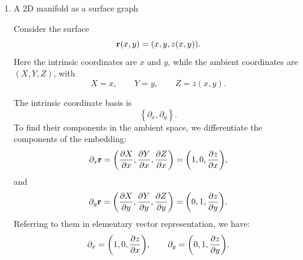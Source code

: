 \begin{enumerate}[(1)]
				Referring to them in the same way as elementary vector physics\footnote{I must reiterate this enough. This is a heuristic, a tool, that relates the abstract vector to how it is usually presented in introductory physics to make it more intuitive. Do not confuse the elementary vector representation to what the actual vector (geometric object) is. They are not the same thing.}
				Thus, the two coordinate basis vectors have the ambient
				representations
				\begin{align*}
					\partial_\theta
					&=
					\pqty{
						\cos\theta\cos\phi,
						\cos\theta\sin\phi,
						-\sin\theta
					}\\
					\partial_\phi
					&=
					\pqty{
						-\sin\theta\sin\phi,
						\sin\theta\cos\phi,
						0
					}
				\end{align*}
				An arbitrary tangent vector is
				\[
					V
					=
					V^\theta\partial_\theta
					+
					V^\phi\partial_\phi.
				\]
				Therefore, its ambient components are
				\[
					V
					=
					\bmqty{
						V^\theta\cos\theta\cos\phi
						-
						V^\phi\sin\theta\sin\phi\\
						V^\theta\cos\theta\sin\phi
						+
						V^\phi\sin\theta\cos\phi\\
						-V^\theta\sin\theta
					}
				\]

				Thus, although the vector is represented by three components
				in the ambient space, it has only two independent components,
				$V^\theta$ and $V^\phi$, because it is tangent to a $2$D manifold.
			\item A $2$D manifold as a surface graph

				Consider the surface
				\[
					\vb{r}(x,y)
					=
					\qty(
						x,y,z(x,y)
					).
				\]
				Here the intrinsic coordinates are $x$ and $y$, while the
				ambient coordinates are $(X,Y,Z)$, with
				\[
					X=x,
					\qquad
					Y=y,
					\qquad
					Z=z(x,y).
				\]

				The intrinsic coordinate basis is
				\[
					\left\{
						\partial_x,\partial_y
					\right\}.
				\]
				To find their components in the ambient space, we differentiate
				the components of the embedding:
				\[
					\partial_x\vb{r}
					=
					\pqty{
						\pdv{X}{x},
						\pdv{Y}{x},
						\pdv{Z}{x}
					}
					=
					\pqty{
						1,
						0,
						\pdv{z}{x}
					},
				\]
				and
				\[
					\partial_y\vb{r}
					=
					\pqty{
						\pdv{X}{y},
						\pdv{Y}{y},
						\pdv{Z}{y}
					}
					=
					\pqty{
						0,
						1,
						\pdv{z}{y}
					}.
				\]
				Referring to them in elementary vector representation, we have:
				\[
					\partial_x
					=
					\pqty{
						1,
						0,
						\pdv{z}{x}
					},
					\qquad
					\partial_y
					=
					\pqty{
						0,
						1,
						\pdv{z}{y}
					}.
				\]


\end{enumerate}
